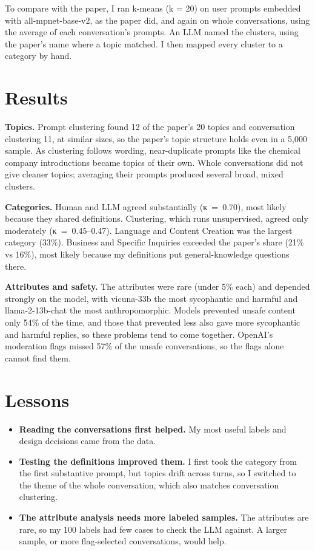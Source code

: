 \documentclass[10pt]{article}
\begin{document}
To compare with the paper, I ran k-means (k = 20) on user prompts embedded with all-mpnet-base-v2, as the paper did, and again on whole conversations, using the average of each conversation's prompts. An LLM named the clusters, using the paper's name where a topic matched. I then mapped every cluster to a category by hand.

\section*{Results}

\textbf{Topics.} Prompt clustering found 12 of the paper's 20 topics and conversation clustering 11, at similar sizes, so the paper's topic structure holds even in a 5,000 sample. As clustering follows wording, near-duplicate prompts like the chemical company introductions became topics of their own. Whole conversations did not give cleaner topics; averaging their prompts produced several broad, mixed clusters.

\textbf{Categories.} Human and LLM agreed substantially (κ~=~0.70), most likely because they shared definitions. Clustering, which runs unsupervised, agreed only moderately (κ~=~\mbox{0.45–0.47}). Language and Content Creation was the largest category (33\%). Business and Specific Inquiries exceeded the paper's share (21\% vs 16\%), most likely because my definitions put general-knowledge questions there.

\textbf{Attributes and safety.} The attributes were rare (under 5\% each) and depended strongly on the model, with \mbox{vicuna-33b} the most sycophantic and harmful and \mbox{llama-2-13b-chat} the most anthropomorphic. Models prevented unsafe content only 54\% of the time, and those that prevented less also gave more sycophantic and harmful replies, so these problems tend to come together. OpenAI's moderation flags missed 57\% of the unsafe conversations, so the flags alone cannot find them.

\section*{Lessons}

\begin{itemize}
  \item \textbf{Reading the conversations first helped.} My most useful labels and design decisions came from the data.
  \item \textbf{Testing the definitions improved them.} I first took the category from the first substantive prompt, but topics drift across turns, so I switched to the theme of the whole conversation, which also matches conversation clustering.
  \item \textbf{The attribute analysis needs more labeled samples.} The attributes are rare, so my 100 labels had few cases to check the LLM against. A larger sample, or more flag-selected conversations, would help.
\end{itemize}
\end{document}
